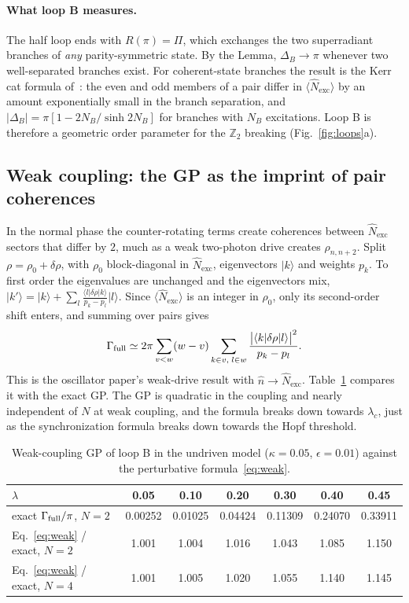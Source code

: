 \documentclass[11pt,a4paper]{article}
\newcommand{\ket}[1]{\lvert #1\rangle}
\newcommand{\bra}[1]{\langle #1\rvert}
\newcommand{\ev}[1]{\langle #1\rangle}
\newcommand{\Nex}{\hat N_{\mathrm{exc}}}
\begin{document}
\paragraph{What loop B measures.} The half loop ends with $R(\pi)=\Pi$, which exchanges the two
superradiant branches of \emph{any} parity-symmetric state. By the Lemma, $\Delta_B\to\pi$
whenever two well-separated branches exist. For coherent-state branches the result is the Kerr
cat formula of~\cite{sun_gp}: the even and odd members of a pair differ in $\ev{\Nex}$ by an
amount exponentially small in the branch separation, and
$|\Delta_B|=\pi[1-2N_B/\sinh 2N_B]$ for branches with $N_B$ excitations. Loop B is therefore a
geometric order parameter for the $\mathbb Z_2$ breaking (Fig.~\ref{fig:loops}a).

\subsection{Weak coupling: the GP as the imprint of pair coherences}

In the normal phase the counter-rotating terms create coherences between $\Nex$ sectors that
differ by $2$, much as a weak two-photon drive creates $\rho_{n,n+2}$. Split
$\rho=\rho_0+\delta\rho$, with $\rho_0$ block-diagonal in $\Nex$, eigenvectors $\ket k$ and
weights $p_k$. To first order the eigenvalues are unchanged and the eigenvectors mix,
$\ket{k'}=\ket k+\sum_l\frac{\bra l\delta\rho\ket k}{p_k-p_l}\ket l$. Since $\ev{\Nex}$ is an
integer in $\rho_0$, only its second-order shift enters, and summing over pairs gives
\begin{equation}
\Gamma_{\rm full}\simeq2\pi\sum_{v<w}(w-v)\sum_{k\in v,\;l\in w}
\frac{\big|\bra k\delta\rho\ket l\big|^2}{p_k-p_l} .
\label{eq:weak}
\end{equation}
This is the oscillator paper's weak-drive result with $\hat n\to\Nex$. Table~\ref{tab:weak}
compares it with the exact GP. The GP is quadratic in the coupling and nearly independent of
$N$ at weak coupling, and the formula breaks down towards $\lambda_c$, just as the
synchronization formula breaks down towards the Hopf threshold.

\begin{table}[h]
\centering
\begin{tabular}{@{}lcccccc@{}}
\toprule
$\lambda$ & 0.05 & 0.10 & 0.20 & 0.30 & 0.40 & 0.45 \\
\midrule
exact $\Gamma_{\rm full}/\pi$, $N=2$ & 0.00252 & 0.01025 & 0.04424 & 0.11309 & 0.24070 & 0.33911 \\
Eq.~\eqref{eq:weak} / exact, $N=2$ & 1.001 & 1.004 & 1.016 & 1.043 & 1.085 & 1.150 \\
Eq.~\eqref{eq:weak} / exact, $N=4$ & 1.001 & 1.005 & 1.020 & 1.055 & 1.140 & 1.145 \\
\bottomrule
\end{tabular}
\caption{Weak-coupling GP of loop B in the undriven model ($\kappa=0.05$, $\epsilon=0.01$)
against the perturbative formula~\eqref{eq:weak}.}
\label{tab:weak}
\end{table}
\end{document}
